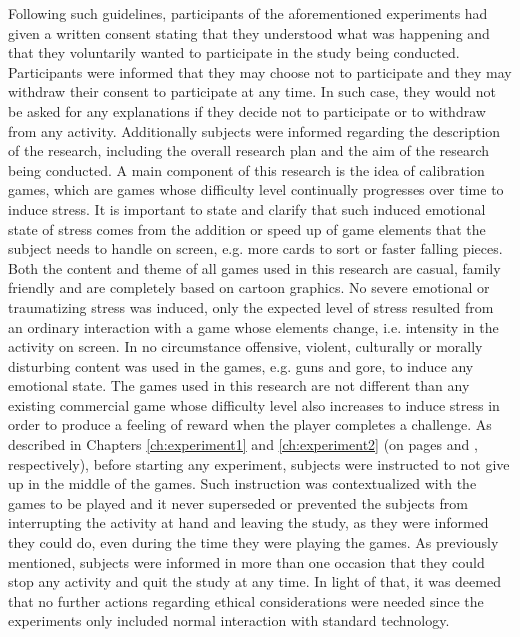 Following such guidelines, participants of the aforementioned experiments had given a written consent stating that they understood what was happening and that they voluntarily wanted to participate in the study being conducted. Participants were informed that they may choose not to participate and they may withdraw their consent to participate at any time. In such case, they would not be asked for any explanations if they decide not to participate or to withdraw from any activity. Additionally subjects were informed regarding the description of the research, including the overall research plan and the aim of the research being conducted. A main component of this research is the idea of calibration games, which are games whose difficulty level continually progresses over time to induce stress. It is important to state and clarify that such induced emotional state of stress comes from the addition or speed up of game elements that the subject needs to handle on screen, e.g. more cards to sort or faster falling pieces. Both the content and theme of all games used in this research are casual, family friendly and are completely based on cartoon graphics. No severe emotional or traumatizing stress was induced, only the expected level of stress resulted from an ordinary interaction with a game whose elements change, i.e. intensity in the activity on screen. In no circumstance offensive, violent, culturally or morally disturbing content was used in the games, e.g. guns and gore, to induce any emotional state. The games used in this research are not different than any existing commercial game whose difficulty level also increases to induce stress in order to produce a feeling of reward when the player completes a challenge. As described in Chapters \ref{ch:experiment1} and \ref{ch:experiment2} (on pages \pageref{ch:experiment1} and \pageref{ch:experiment2}, respectively), before starting any experiment, subjects were instructed to not give up in the middle of the games. Such instruction was contextualized with the games to be played and it never superseded or prevented the subjects from interrupting the activity at hand and leaving the study, as they were informed they could do, even during the time they were playing the games. As previously mentioned, subjects were informed in more than one occasion that they could stop any activity and quit the study at any time. In light of that, it was deemed that no further actions regarding ethical considerations were needed since the experiments only included normal interaction with standard technology.

